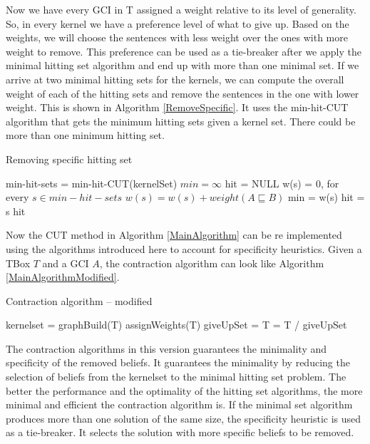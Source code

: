 Now we have every GCI in T assigned a weight relative to its level of generality. So, in every kernel we have a preference level of what to give up. Based on the weights, we will choose the sentences with less weight over the ones with more weight to remove. This preference can be used as a tie-breaker after we apply the minimal hitting set algorithm and end up with more than one minimal set. If we arrive at two minimal hitting sets for the kernels, we can compute the overall weight of each of the hitting sets and remove the sentences in the one with lower weight. This is shown in Algorithm \ref{RemoveSpecific}. It uses the min-hit-CUT algorithm that gets the minimum hitting sets given a kernel set. There could be more than one minimum hitting set.

\begin{algorithm}
\caption{Removing specific hitting set}
\label{RemoveSpecific}
\begin{algorithmic}[1]
\State min-hit-sets = min-hit-CUT(kernelSet)
\State $min = \infty$
\State hit = NULL
\State w(s) = 0, for every $s \in min-hit-sets$
\State $w(s) = w(s) + weight(A \sqsubseteq B)$
\EndFor
{}
\State min = w(s)
\State hit = s
\EndIf
\EndFor
\State
\Return hit
\EndFunction
\end{algorithmic}
\end{algorithm}

Now the CUT method in Algorithm \ref{MainAlgorithm} can be re implemented using the algorithms introduced here to account for specificity heuristics. Given a TBox $T$ and a GCI $A$, the contraction algorithm can look like Algorithm \ref{MainAlgorithmModified}.

\begin{algorithm}
\caption{Contraction algorithm -- modified}
\label{MainAlgorithmModified}
\begin{algorithmic}[1]
\State kernelset = 
\State graphBuild(T)
\State assignWeights(T)
\State giveUpSet = 
\State T = T / giveUpSet
\EndProcedure
\end{algorithmic}
\end{algorithm}

The contraction algorithms in this version guarantees the minimality and specificity of the removed beliefs. It guarantees the minimality by reducing the selection of beliefs from the kernelset to the minimal hitting set problem. The better the performance and the optimality of the hitting set algorithms, the more minimal and efficient the contraction algorithm is. If the minimal set algorithm produces more than one solution of the same size, the specificity heuristic is used as a tie-breaker. It selects the solution with more specific beliefs to be removed.

